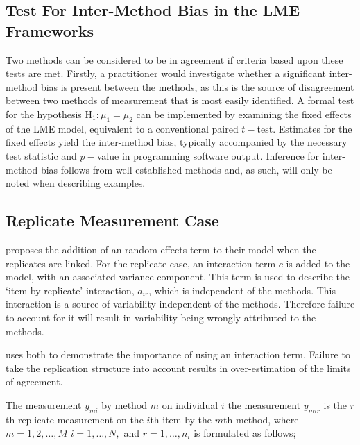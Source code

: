 \documentclass[12pt, a4paper]{report}
\theoremstyle{plain}
\theoremstyle{definition}
\theoremstyle{remark}
\begin{document}
\subsection{Test For Inter-Method Bias in the LME Frameworks}
 Two methods can be considered to be in agreement if criteria based upon these tests are met. Firstly, a practitioner would investigate whether a significant inter-method bias is present between the methods, as this is the source of disagreement between two methods of measurement that is most easily identified. A formal test for the hypothesis $\operatorname{H_1} : \mu_1 = \mu_2$ can be implemented by examining the fixed effects of the LME model, equivalent to a conventional paired $t-$test. Estimates for the fixed effects yield the inter-method bias, typically accompanied by the necessary test statistic and $p-$value in programming software output. Inference for inter-method bias follows from well-established methods and, as such, will only be noted when describing examples.

\subsection*{Replicate Measurement Case}

\citet{BXC2008} proposes the addition of an random effects term to their model when the replicates are linked. For the replicate case, an interaction term $c$ is added to the model, with an associated variance component. This term is used to describe the `item by replicate' interaction, $a_{ir}$, which is independent of the methods. This interaction is a source of variability independent of the methods. Therefore failure to account for it will result in variability being wrongly attributed to the methods.

\citet{BXC2008} uses both to demonstrate the importance of using an interaction term. Failure to take the replication structure into account results in over-estimation of the limits of agreement.

The measurement $y_{mi}$ by method $m$ on individual $i$ the measurement $y_{mir} $ is the $r$th replicate measurement on the $i$th item by the $m$th method, where $m=1,2,\ldots,M$ $i=1,\ldots,N,$ and $r = 1,\ldots,n_i$ is formulated as follows;

\end{document}
